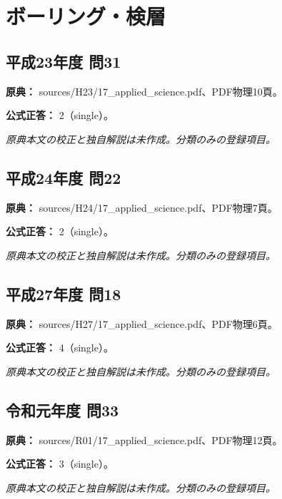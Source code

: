 \section{ボーリング・検層}

\subsection{平成23年度 問31}
\label{q:h23-reg-applied-31}

\noindent\textbf{原典：} sources/H23/17\_applied\_science.pdf、PDF物理10頁。

\textbf{公式正答：} 2（single）。

\par\textit{原典本文の校正と独自解説は未作成。分類のみの登録項目。}

\subsection{平成24年度 問22}
\label{q:h24-reg-applied-22}

\noindent\textbf{原典：} sources/H24/17\_applied\_science.pdf、PDF物理7頁。

\textbf{公式正答：} 2（single）。

\par\textit{原典本文の校正と独自解説は未作成。分類のみの登録項目。}

\subsection{平成27年度 問18}
\label{q:h27-reg-applied-18}

\noindent\textbf{原典：} sources/H27/17\_applied\_science.pdf、PDF物理6頁。

\textbf{公式正答：} 4（single）。

\par\textit{原典本文の校正と独自解説は未作成。分類のみの登録項目。}

\subsection{令和元年度 問33}
\label{q:r01-reg-applied-33}

\noindent\textbf{原典：} sources/R01/17\_applied\_science.pdf、PDF物理12頁。

\textbf{公式正答：} 3（single）。

\par\textit{原典本文の校正と独自解説は未作成。分類のみの登録項目。}

